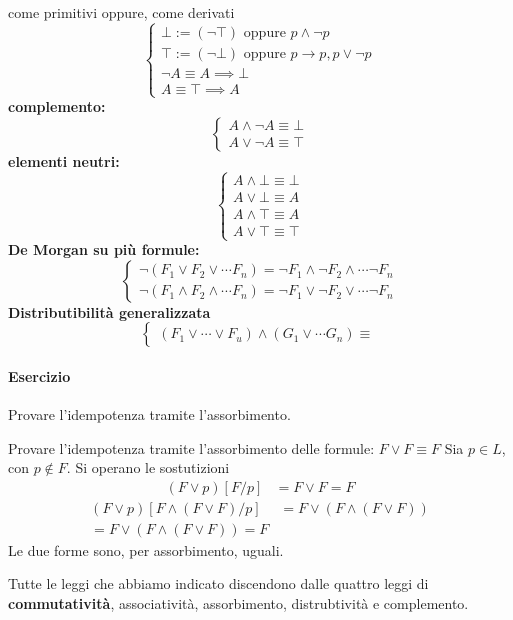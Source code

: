 come primitivi oppure, come derivati
$$
\begin{cases}
  \bot := (\neg \top) \text{ oppure } p \land \neg p \\
  \top := (\neg \bot) \text{ oppure } p \rightarrow p, p \lor \neg p \\
  \neg A \equiv A \implies \bot \\
  A \equiv \top \implies A 
\end{cases}
$$
\noindent 
\textbf{complemento:}
$$
\begin{cases}
  A \land \neg A \equiv \bot \\
  A \lor \neg A \equiv \top 
\end{cases}
$$
\noindent 
\textbf{elementi neutri:}
$$
\begin{cases}
  A \land \bot \equiv \bot \\
  A \lor \bot \equiv A \\
  A \land \top \equiv A \\
  A \lor \top  \equiv\top 
\end{cases}
$$
\noindent
\textbf{De Morgan su più formule:}
$$
\begin{cases}
  \neg (F_1 \lor F_2 \lor \cdots F_n) = \neg F_1 \land \neg F_2 \land \cdots \neg F_n\\
  \neg (F_1 \land F_2 \land \cdots F_n) = \neg F_1 \lor \neg F_2  \lor \cdots \neg F_n
\end{cases}
$$
\noindent 
\textbf{Distributibilità generalizzata}
$$
\begin{cases}
  (F_1 \lor \cdots \lor F_u) \land (G_1 \lor \cdots G_n) \equiv 
\end{cases}
$$
\paragraph{Esercizio}
Provare l'idempotenza tramite l'assorbimento. 

Provare l'idempotenza tramite l'assorbimento delle formule: $F \lor F \equiv F$ Sia $p \in L $, con $p \notin F$. Si operano le sostutizioni \begin{align*} (F\lor p) [ F/p] &= F \lor F = F \end{align*} \begin{align*} (F\lor p) [ F\land(F \lor F)/p] &= F \lor (F \land (F \lor F)) \\
  = F \lor (F \land (F \lor F)) = F
\end{align*}
Le due forme sono, per assorbimento, uguali. 

Tutte le leggi che abbiamo indicato discendono dalle 
quattro leggi di \textbf{commutatività}, associatività, 
assorbimento, distrubtività e complemento. 

